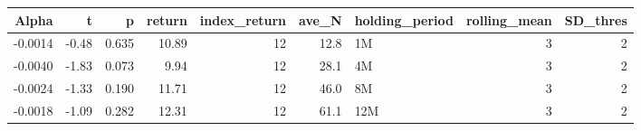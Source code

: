 \begin{table}[ht]
\centering
\begin{tabular}{rrrrrrlrr}
  \hline
Alpha & t & p & return & index\_return & ave\_N & holding\_period & rolling\_mean & SD\_thres \\ 
  \hline
-0.0014 & -0.48 & 0.635 & 10.89 & 12 & 12.8 & 1M &  3 &  2 \\ 
  -0.0040 & -1.83 & 0.073 & 9.94 & 12 & 28.1 & 4M &  3 &  2 \\ 
  -0.0024 & -1.33 & 0.190 & 11.71 & 12 & 46.0 & 8M &  3 &  2 \\ 
  -0.0018 & -1.09 & 0.282 & 12.31 & 12 & 61.1 & 12M &  3 &  2 \\ 
   \hline
\end{tabular}
\end{table}

